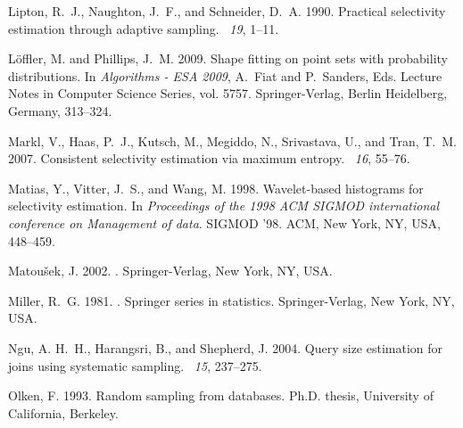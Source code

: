 \begin{thebibliography}{}
{\sc Lipton, R.~J.}, {\sc Naughton, J.~F.}, {\sc and} {\sc Schneider, D.~A.}
  1990.
\newblock Practical selectivity estimation through adaptive sampling.
~{\em 19}, 1--11.

{\sc L\"{o}ffler, M.} {\sc and} {\sc Phillips, J.~M.} 2009.
\newblock Shape fitting on point sets with probability distributions.
\newblock In {\em Algorithms - ESA 2009}, {A.~Fiat} {and} {P.~Sanders}, Eds.
  Lecture Notes in Computer Science Series, vol. 5757. Springer-Verlag, Berlin
  Heidelberg, Germany, 313--324.

{\sc Markl, V.}, {\sc Haas, P.~J.}, {\sc Kutsch, M.}, {\sc Megiddo, N.}, {\sc
  Srivastava, U.}, {\sc and} {\sc Tran, T.~M.} 2007.
\newblock Consistent selectivity estimation via maximum entropy.
~{\em 16}, 55--76.

{\sc Matias, Y.}, {\sc Vitter, J.~S.}, {\sc and} {\sc Wang, M.} 1998.
\newblock Wavelet-based histograms for selectivity estimation.
\newblock In {\em Proceedings of the 1998 ACM SIGMOD international conference
  on Management of data}. SIGMOD '98. ACM, New York, NY, USA, 448--459.

{\sc Matou\v{s}ek, J.} 2002.
.
\newblock Springer-Verlag, New York, NY, USA.

{\sc Miller, R.~G.} 1981.
.
\newblock Springer series in statistics. Springer-Verlag, New York, NY, USA.

{\sc Ngu, A. H.~H.}, {\sc Harangsri, B.}, {\sc and} {\sc Shepherd, J.} 2004.
\newblock Query size estimation for joins using systematic sampling.
~{\em 15}, 237--275.

{\sc Olken, F.} 1993.
\newblock Random sampling from databases.
\newblock Ph.D. thesis, University of California, Berkeley.


\end{thebibliography}
